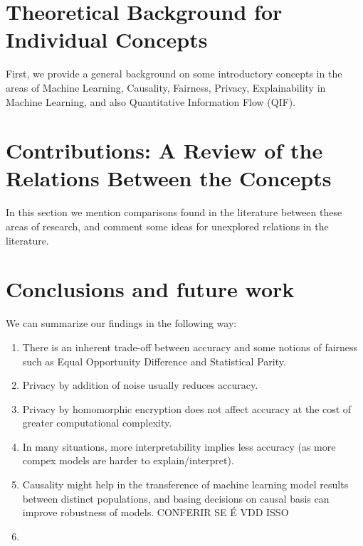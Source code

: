 \documentclass{article}
\begin{document}
\section{Theoretical Background for Individual Concepts}\label{sec:theoRef1}

First, we provide a general background on some introductory concepts in the areas of Machine Learning, Causality, Fairness, Privacy, Explainability in Machine Learning, and also Quantitative Information Flow (QIF).



\section{Contributions: A Review of the Relations Between the Concepts}\label{sec:theoRef2}

In this section we mention comparisons found in the literature between these areas of research, and comment some ideas for unexplored relations in the literature.



\section{Conclusions and future work}\label{sec:concsFuture}

We can summarize our findings in the following way:

\begin{enumerate}
    \item There is an inherent trade-off between accuracy and some notions of fairness such as Equal Opportunity Difference and Statistical Parity.
    \item Privacy by addition of noise usually reduces accuracy.
    \item Privacy by homomorphic encryption does not affect accuracy at the cost of greater computational complexity.
    \item In many situations, more interpretability implies less accuracy (as more compex models are harder to explain/interpret).
    \item Causality might help in the transference of machine learning model results between distinct populations, and basing decisions on causal basis can improve robustness of models. {\color{red} CONFERIR SE É VDD ISSO}
    \item 
\end{enumerate}
\end{document}
